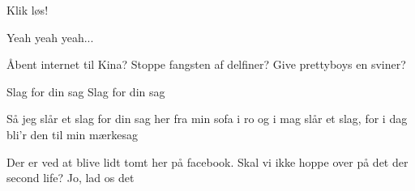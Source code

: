 \documentclass[a4paper,11pt]{article}
\begin{document}
\begin{song}
 Klik løs!

 Yeah yeah yeah...


 Åbent internet til Kina? 
 Stoppe fangsten af delfiner?  
 Give prettyboys en sviner? 


 Slag for din sag
 Slag for din sag

 Så jeg slår et slag for din sag
	her fra min sofa i ro og i mag
	slår et slag, for i dag
	bli'r den til min mærkesag


 Der er ved at blive lidt tomt her på facebook. Skal vi ikke
hoppe over på det der second life?
 Jo, lad os det

\end{song}
\end{document}
